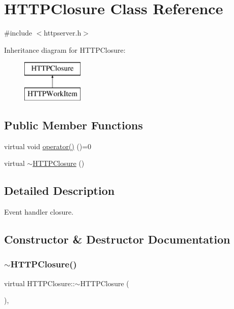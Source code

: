 \hypertarget{class_h_t_t_p_closure}{}\section{H\+T\+T\+P\+Closure Class Reference}
\label{class_h_t_t_p_closure}


{\ttfamily \#include $<$httpserver.\+h$>$}

Inheritance diagram for H\+T\+T\+P\+Closure\+:\begin{figure}[H]
\begin{center}
\leavevmode
\includegraphics[height=2.000000cm]{class_h_t_t_p_closure}
\end{center}
\end{figure}
\subsection*{Public Member Functions}
\begin{DoxyCompactItemize}
\item 
virtual void \mbox{\hyperlink{class_h_t_t_p_closure_abbce5d429a7fe2b593919550e50bc225}{operator()}} ()=0
\item 
virtual \mbox{\hyperlink{class_h_t_t_p_closure_af3cc5a621020ea4ddef1170dead00be4}{$\sim$\+H\+T\+T\+P\+Closure}} ()
\end{DoxyCompactItemize}


\subsection{Detailed Description}
Event handler closure. 

\subsection{Constructor \& Destructor Documentation}
\mbox{\label{class_h_t_t_p_closure_af3cc5a621020ea4ddef1170dead00be4}} 
\subsubsection{\texorpdfstring{$\sim$\+H\+T\+T\+P\+Closure()}{~HTTPClosure()}}
{\footnotesize\ttfamily virtual H\+T\+T\+P\+Closure\+::$\sim$\+H\+T\+T\+P\+Closure (\begin{DoxyParamCaption}{ }\end{DoxyParamCaption})\hspace{0.3cm}{\ttfamily [inline]}, {\ttfamily [virtual]}}



